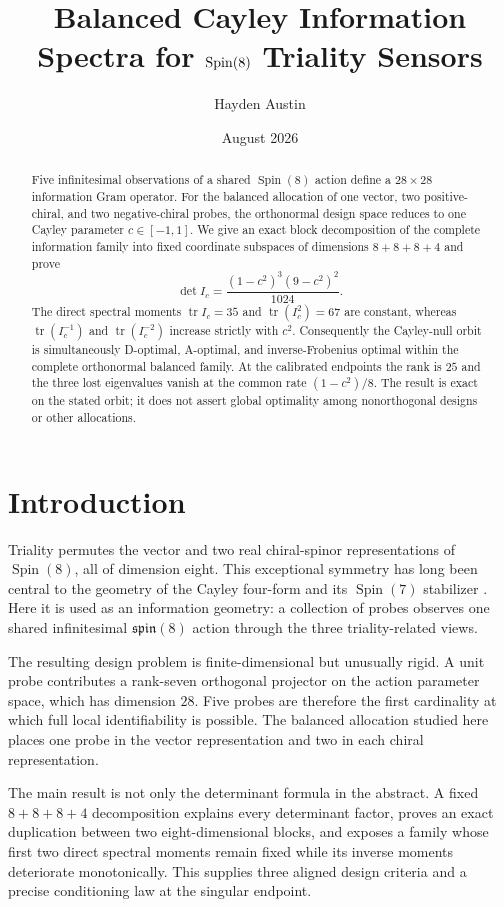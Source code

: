 \documentclass[11pt]{amsart}
\title[Balanced Cayley information spectra]{Balanced Cayley Information Spectra for $\Spin(8)$ Triality Sensors}
\author{Hayden Austin}
\date{August 2026}
\theoremstyle{remark}
\DeclareMathOperator{\Spin}{Spin}
\DeclareMathOperator{\tr}{tr}
\begin{document}
\begin{abstract}
Five infinitesimal observations of a shared $\Spin(8)$ action define a
$28\times28$ information Gram operator.  For the balanced allocation of one
vector, two positive-chiral, and two negative-chiral probes, the orthonormal
design space reduces to one Cayley parameter $c\in[-1,1]$.  We give an exact
block decomposition of the complete information family into fixed coordinate
subspaces of dimensions $8+8+8+4$ and prove
\[
  \det I_c=\frac{(1-c^2)^3(9-c^2)^2}{1024}.
\]
The direct spectral moments $\tr I_c=35$ and $\tr(I_c^2)=67$ are constant,
whereas $\tr(I_c^{-1})$ and $\tr(I_c^{-2})$ increase strictly with $c^2$.
Consequently the Cayley-null orbit is simultaneously D-optimal, A-optimal,
and inverse-Frobenius optimal within the complete orthonormal balanced family.
At the calibrated endpoints the rank is $25$ and the three lost eigenvalues
vanish at the common rate $(1-c^2)/8$.  The result is exact on the stated
orbit; it does not assert global optimality among nonorthogonal designs or
other allocations.
\end{abstract}

\maketitle

\section{Introduction}

Triality permutes the vector and two real chiral-spinor representations of
$\Spin(8)$, all of dimension eight.  This exceptional symmetry has long been
central to the geometry of the Cayley four-form and its $\Spin(7)$ stabilizer
\cite{HarveyLawson1982,KatzShnider2010}.  Here it is used as an information
geometry: a collection of probes observes one shared infinitesimal
$\mathfrak{spin}(8)$ action through the three triality-related views.

The resulting design problem is finite-dimensional but unusually rigid.  A
unit probe contributes a rank-seven orthogonal projector on the action
parameter space, which has dimension $28$.  Five probes are therefore the
first cardinality at which full local identifiability is possible.  The
balanced allocation studied here places one probe in the vector representation
and two in each chiral representation.

The main result is not only the determinant formula in the abstract.  A fixed
$8+8+8+4$ decomposition explains every determinant factor, proves an exact
duplication between two eight-dimensional blocks, and exposes a family whose
first two direct spectral moments remain fixed while its inverse moments
deteriorate monotonically.  This supplies three aligned design criteria and a
precise conditioning law at the singular endpoint.
\end{document}
